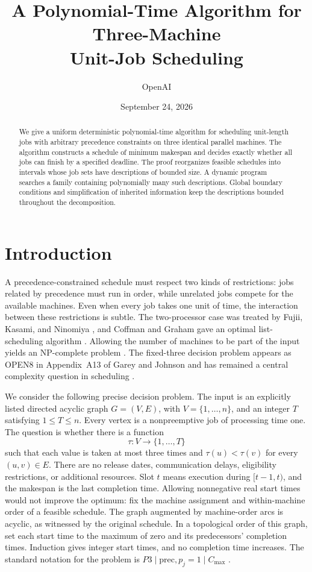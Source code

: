\documentclass[11pt]{article}
\title{A Polynomial-Time Algorithm for Three-Machine\\
Unit-Job Scheduling}
\author{OpenAI}
\date{September 24, 2026}
\numberwithin{equation}{section}
\theoremstyle{definition}
\theoremstyle{remark}
\begin{document}
\maketitle
\begin{abstract}
We give a uniform deterministic polynomial-time algorithm for scheduling
unit-length jobs with arbitrary precedence constraints on three identical
parallel machines. The algorithm constructs a schedule of minimum makespan
and decides exactly whether all jobs can finish by a specified deadline.
The proof reorganizes feasible schedules
into intervals whose job sets have descriptions of bounded size.
A dynamic program searches a family containing polynomially many such
descriptions. Global boundary conditions and simplification of inherited
information keep the descriptions bounded throughout the decomposition.
\end{abstract}

\section{Introduction}\label{sec:introduction}

A precedence-constrained schedule must respect two kinds of restrictions:
jobs related by precedence must run in order, while unrelated jobs compete
for the available machines. Even when every job takes one unit of time, the
interaction between these restrictions is subtle. The two-processor case
was treated by Fujii, Kasami, and Ninomiya
\citep{FujiiKasamiNinomiya1969,FujiiKasamiNinomiya1971Erratum}, and
Coffman and Graham gave an optimal list-scheduling algorithm
\citep{CG1972}. Allowing the number of machines to be part of the input
yields an NP-complete problem \citep[Theorem~1]{Ullman1975}.
The fixed-three decision problem appears as OPEN8 in Appendix~A13 of
Garey and Johnson \citep{GJ1979} and has remained a central complexity
question in scheduling \citep{NSW2025}.

We consider the following precise decision problem. The input is an
explicitly listed directed acyclic graph \(G=(V,E)\), with
\(V=\{1,\ldots,n\}\), and an integer \(T\) satisfying \(1\le T\le n\).
Every vertex is a nonpreemptive job of processing time one. The question
is whether there is a function
\[
 \tau:V\longrightarrow\{1,\ldots,T\}
\]
such that each value is taken at most three times and
\(\tau(u)<\tau(v)\) for every \((u,v)\in E\).
There are no release dates, communication delays, eligibility restrictions,
or additional resources.
Slot \(t\) means execution during \([t-1,t)\), and the makespan is
the last completion time. Allowing nonnegative real start times would
not improve the optimum: fix the machine assignment and within-machine
order of a feasible schedule. The graph augmented by machine-order arcs
is acyclic, as witnessed by the original schedule. In a topological order
of this graph, set each start time to the maximum of zero and its
predecessors' completion times. Induction gives integer start times,
and no completion time increases.
The standard notation for the problem is
\(P3\mid\mathrm{prec},p_j=1\mid C_{\max}\)
\citep{GrahamLawlerLenstraRinnooyKan1979}.
\end{document}
